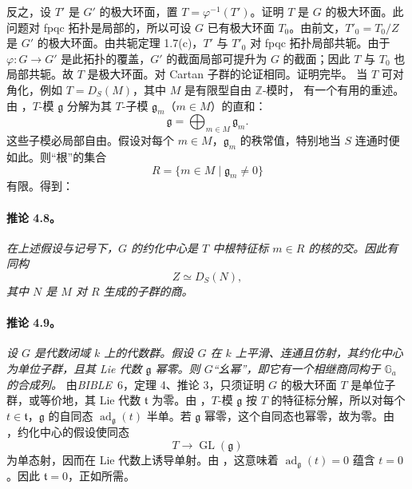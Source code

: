 反之，设 \(T'\) 是 \(G'\) 的极大环面，置 \(T=\varphi^{-1}(T')\)。证明 \(T\) 是 \(G\) 的极大环面。此问题对 fpqc 拓扑是局部的，所以可设 \(G\) 已有极大环面 \(T_0\)。由前文，\(T'_0=T_0/Z\) 是 \(G'\) 的极大环面。由共轭定理 1.7(c)，\(T'\) 与 \(T'_0\) 对 fpqc 拓扑局部共轭。由于 \(\varphi:G\to G'\) 是此拓扑的覆盖，\(G'\) 的截面局部可提升为 \(G\) 的截面；因此 \(T\) 与 \(T_0\) 也局部共轭。故 \(T\) 是极大环面。对 Cartan 子群的论证相同。证明完毕。
当 \(T\) 可对角化，例如 \(T=D_S(M)\)，其中 \(M\) 是有限型自由 \(\mathbb Z\)-模时，\textup{} 有一个有用的重述。由 ，\(T\)-模 \(\mathfrak g\) 分解为其 \(T\)-子模 \(\mathfrak g_m\)（\(m\in M\)）的直和：
\[
  \mathfrak g=\bigoplus_{m\in M}\mathfrak g_m.
\]
这些子模必局部自由。假设对每个 \(m\in M\)，\(\mathfrak g_m\) 的秩常值，特别地当 \(S\) 连通时便如此。则“根”的集合
\[
  R=\{m\in M\mid\mathfrak g_m\ne0\}
\]
有限。得到：
\paragraph{\textbf{推论 4.8。}}
\emph{在上述假设与记号下，\(G\) 的约化中心是 \(T\) 中根特征标 \(m\in R\) 的核的交。因此有同构
\[
  Z\simeq D_S(N),
\]
其中 \(N\) 是 \(M\) 对 \(R\) 生成的子群的商。}
\paragraph{\textbf{推论 4.9。}}
\emph{设 \(G\) 是代数闭域 \(k\) 上的代数群。假设 \(G\) 在 \(k\) 上平滑、连通且仿射，其约化中心为单位子群，且其 Lie 代数 \(\mathfrak g\) 幂零。则 \(G\)“幺幂”，即它有一个相继商同构于 \(\mathbb G_a\) 的合成列。}
由\emph{BIBLE}~6，定理 4、推论 3，只须证明 \(G\) 的极大环面 \(T\) 是单位子群，或等价地，其 Lie 代数 \(\mathfrak t\) 为零。由 ，\(T\)-模 \(\mathfrak g\) 按 \(T\) 的特征标分解，所以对每个 \(t\in\mathfrak t\)，\(\mathfrak g\) 的自同态 \(\operatorname{ad}_{\mathfrak g}(t)\) 半单。若 \(\mathfrak g\) 幂零，这个自同态也幂零，故为零。由 ，约化中心的假设使同态
\[
  T\longrightarrow\operatorname{GL}(\mathfrak g)
\]
为单态射，因而在 Lie 代数上诱导单射。由 ，这意味着 \(\operatorname{ad}_{\mathfrak g}(t)=0\) 蕴含 \(t=0\)。因此 \(\mathfrak t=0\)，正如所需。
